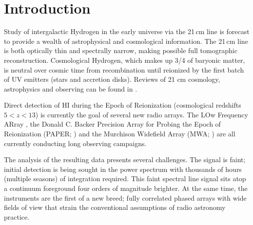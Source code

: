 \section{Introduction} 
  Study of intergalactic Hydrogen  in the early universe via the 21\,cm line is forecast to provide a wealth of astrophysical and cosmological information.  The 21\,cm line is both optically thin and spectrally narrow, making possible full tomographic reconstruction. Cosmological Hydrogen, which makes up 3/4 of baryonic matter, is neutral over cosmic time from recombination until reionized by the first batch of UV emitters (stars and accretion disks).  Reviews of 21 cm cosmology, astrophysics and observing can be found in \cite{Morales:2010p8093,Furlanetto:2006p2267,Pritchard:2012p9555,zaroubi2013epoch}.
  
Direct detection of HI during the Epoch of Reionization (cosmological redshifts $5<z<13$) is currently the goal of several new radio arrays. The LOw Frequency ARray \citep[LOFAR;]{Yatawatta:2013p9699}, the Donald C. Backer Precision Array for Probing the Epoch of Reionization (PAPER; \citet{Parsons:2014p10499}) and the Murchison Widefield Array (MWA; ) are all currently conducting long observing campaigns.

The analysis of the resulting data presents several challenges. The signal is faint; initial detection is being sought in the power spectrum with thousands of hours (multiple seasons) of integration required. This faint spectral line signal sits atop a continuum foreground four orders of magnitude brighter. At the same time, the instruments are the first of a new breed; fully correlated phased arrays with wide fields of view that strain the conventional assumptions of radio astronomy practice. 


